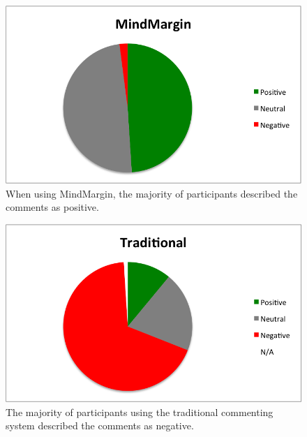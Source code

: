 \begin{figure}[h]
\centering
\includegraphics[scale=0.5]{mm_piechart.png}
\caption{When using MindMargin, the majority of participants described the comments as positive.}
\label{fig:mm_pie}
\end{figure}

\begin{figure}[h]
\centering
\includegraphics[scale=0.5]{traditional_piechart.png}
\caption{The majority of participants using the traditional commenting system described the comments as negative.}
\label{fig:trad_pie}
\end{figure}

